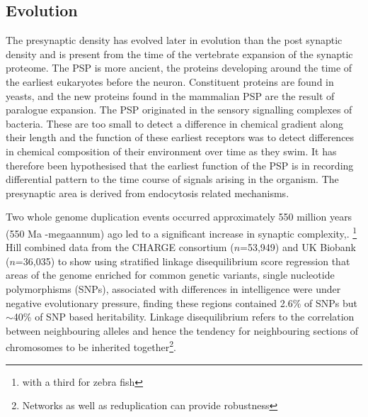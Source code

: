 \subsection{Evolution}
The presynaptic density has evolved later in evolution than the post synaptic density and is present from the time of the vertebrate expansion of the synaptic proteome. The PSP is more ancient, the proteins developing around the time of the earliest eukaryotes before the neuron\cite{grant2018synaptomic}. Constituent proteins are found in yeasts, and the new proteins found in the mammalian PSP are the result of paralogue expansion\cite{grant2016molecular}. The PSP originated in the sensory signalling complexes of bacteria. These are too small to detect a difference in chemical gradient along their length and the function of these earliest receptors was to detect differences in chemical composition of their environment over time as they swim. It has therefore been hypothesised that the earliest function of the PSP is in recording differential pattern to the time course of signals arising in the organism. The presynaptic area is derived from endocytosis related mechanisms.

Two whole genome duplication events occurred approximately 550 million years (550 Ma -megaannum) ago led to a significant increase in synaptic complexity\cite{nithianantharajah2013synaptic},\cite{grant2016molecular}.
\footnote{with a third for zebra fish}
Hill combined data from the CHARGE consortium ($n$=53,949)\cite{davies2015genetic} and UK Biobank ($n$=36,035)\cite{davies2016genome} to show using stratified linkage disequilibrium score regression\cite{finucane2015partitioning} that areas of the genome enriched for common genetic variants, single nucleotide polymorphisms (SNPs), associated with differences in intelligence were under negative evolutionary pressure, finding these regions contained 2.6\% of SNPs but $\sim$40\% of SNP based heritability\cite{hill2016molecular}. Linkage disequilibrium refers to the correlation between neighbouring alleles and hence the tendency for neighbouring sections of chromosomes to be inherited together\cite{reich2001linkage}\footnote{Networks as well as reduplication can provide robustness}.

